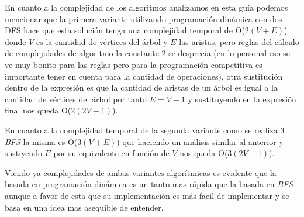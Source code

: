 En  cuanto a la complejidad de los algoritmos analizamos en esta guía podemos mencionar que la primera variante utilizando programación dinámica con dos DFS hace que esta solución tenga una complejidad temporal de  O($2(V+E)$) donde $V$ es la cantidad de vértices del árbol y $E$ las aristas, pero reglas del cálculo de complejidades de algoritmo la constante $2$ se desprecia (en lo personal eso se ve muy bonito para las reglas pero para la programación competitiva es importante tener en cuenta para la cantidad de operaciones), otra sustitución dentro de la expresión es que la cantidad de aristas de un árbol es igual a la cantidad de vértices del árbol por tanto $E = V-1$ y sustituyendo en la expresión final nos queda O($2(2V-1)$).

En cuanto a la complejidad temporal de la segunda variante como se realiza 3 \emph{BFS} la misma es O($3(V+E)$) que haciendo un análisis similar al anterior y sustiyendo $E$ por su equivalente en función de $V$ nos queda O($3(2V-1)$). 

Viendo ya complejidades de ambas variantes algorítmicas es evidente que la basada en programación dinámica es un tanto mas rápida que la basada en \emph{BFS} aunque a favor de esta que su implementación es más facil de implementar y se basa en una idea mas asequible de entender.  